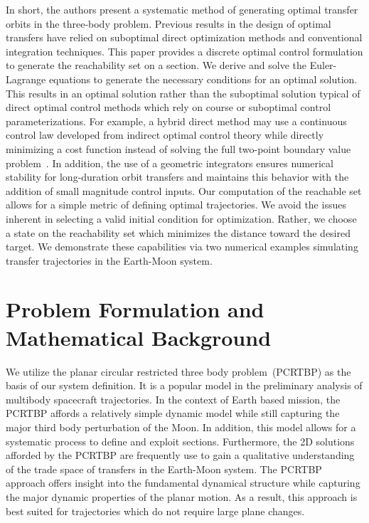 \documentclass[smallcondensed]{svjour3}
\begin{document}
In short, the authors present a systematic method of generating optimal transfer orbits in the three-body problem.
Previous results in the design of optimal transfers have relied on suboptimal direct optimization methods and conventional integration techniques.
This paper provides a discrete optimal control formulation to generate the reachability set on a \Poincare section.
We derive and solve the Euler-Lagrange equations to generate the necessary conditions for an optimal solution.
This results in an optimal solution rather than the suboptimal solution typical of direct optimal control methods which rely on course or suboptimal control parameterizations.
For example, a hybrid direct method may use a continuous control law developed from indirect optimal control theory while directly minimizing a cost function instead of solving the full two-point boundary value problem~\cite{ozimek2010a}.
In addition, the use of a geometric integrators ensures numerical stability for long-duration orbit transfers and maintains this behavior with the addition of small magnitude control inputs.
Our computation of the reachable set allows for a simple metric of defining optimal trajectories.
We avoid the issues inherent in selecting a valid initial condition for optimization.
Rather, we choose a state on the reachability set which minimizes the distance toward the desired target.
We demonstrate these capabilities via two numerical examples simulating transfer trajectories in the Earth-Moon system.

\section{Problem Formulation and Mathematical Background}\label{sec:background}

We utilize the planar circular restricted three body problem~(PCRTBP) as the basis of our system definition. 
It is a popular model in the preliminary analysis of multibody spacecraft trajectories. 
In the context of Earth based mission, the PCRTBP affords a relatively simple dynamic model while still capturing the major third body perturbation of the Moon.
In addition, this model allows for a systematic process to define and exploit \Poincare sections.
Furthermore, the 2D solutions afforded by the PCRTBP are frequently use to gain a qualitative understanding of the trade space of transfers in the Earth-Moon system.
The PCRTBP approach offers insight into the fundamental dynamical structure while capturing the major dynamic properties of the planar motion.
As a result, this approach is best suited for trajectories which do not require large plane changes.
\end{document}
